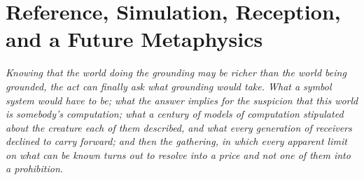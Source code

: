 \documentclass[12pt,openright,twoside]{book}
\theoremstyle{remark}
\theoremstyle{plain}
\theoremstyle{remark}
\theoremstyle{plain}
\theoremstyle{plain}
\begin{document}
\bigskip


\part{Reference, Simulation, Reception, and a Future Metaphysics}
\label{part:reference}

\vspace{1em}
\begin{mdframed}[backgroundcolor=remarkgray, linecolor=gray!60,
                 linewidth=1pt, topline=false, rightline=false,
                 bottomline=false]
\small\itshape
Knowing that the world doing the grounding may be richer than the world
being grounded, the act can finally ask what grounding would take.
What a symbol system would have to be; what the answer implies for the
suspicion that this world is somebody's computation; what a century of
models of computation stipulated about the creature each of them
described, and what every generation of receivers declined to carry
forward; and then the gathering, in which every apparent limit on what
can be known turns out to resolve into a price and not one of them into
a prohibition.
\end{mdframed}

\bigskip



\end{document}
